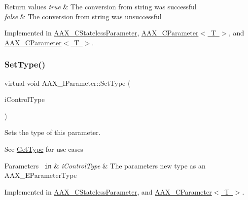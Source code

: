 \begin{DoxyRetVals}{Return values}
{\em true} & The conversion from string was successful \\
\hline
{\em false} & The conversion from string was unsuccessful \\
\hline
\end{DoxyRetVals}


Implemented in \mbox{\hyperlink{a01541_a81fa9bfbd81d7b0f50f677e1a989b779}{A\+A\+X\+\_\+\+C\+Stateless\+Parameter}}, \mbox{\hyperlink{a01537_a73d6d6e280fb970dcc7d65682ace4f73}{A\+A\+X\+\_\+\+C\+Parameter$<$ T $>$}}, and \mbox{\hyperlink{a01537_a0304e07f471e1a9dd804bbba7940281e}{A\+A\+X\+\_\+\+C\+Parameter$<$ T $>$}}.

\mbox{\label{a01857_ac03b38e048e92dd2ec086f9041b52c54}} 
\subsubsection{\texorpdfstring{SetType()}{SetType()}}
{\footnotesize\ttfamily virtual void A\+A\+X\+\_\+\+I\+Parameter\+::\+Set\+Type (\begin{DoxyParamCaption}\item[{\mbox{\hyperlink{a00491_a4cd0f189daa9a60cf36883c56344bb2e}{A\+A\+X\+\_\+\+E\+Parameter\+Type}}}]{i\+Control\+Type }\end{DoxyParamCaption})\hspace{0.3cm}{\ttfamily [pure virtual]}}



Sets the type of this parameter. 

See \mbox{\hyperlink{a01857_a0c096b4092b2146d9aa0413bceeaac48}{Get\+Type}} for use cases


\begin{DoxyParams}[1]{Parameters}
\mbox{\texttt{ in}}  & {\em i\+Control\+Type} & The parameter\textquotesingle{}s new type as an A\+A\+X\+\_\+\+E\+Parameter\+Type \\
\hline
\end{DoxyParams}


Implemented in \mbox{\hyperlink{a01541_ad8043727979721f1c19f69396b5bce92}{A\+A\+X\+\_\+\+C\+Stateless\+Parameter}}, and \mbox{\hyperlink{a01537_a9e02554bfbcc0b7d2598c57d1e2f186c}{A\+A\+X\+\_\+\+C\+Parameter$<$ T $>$}}.

\mbox{\label{a01857_a0c096b4092b2146d9aa0413bceeaac48}} 
